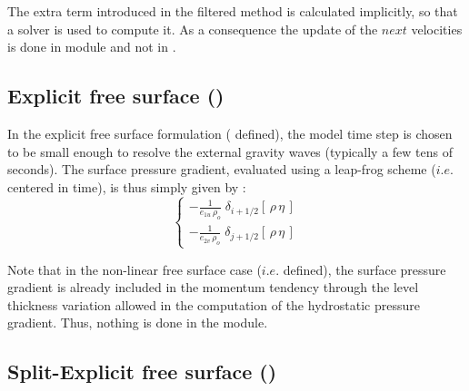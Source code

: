 \documentclass[NEMO_book]{subfiles}
\begin{document}
The extra term introduced in the filtered method is calculated 
implicitly, so that a solver is used to compute it. As a consequence the update of the $next$ 
velocities is done in module  and not in .


\subsection{Explicit free surface ()}
\label{DYN_spg_exp}

In the explicit free surface formulation ( defined), the model time step 
is chosen to be small enough to resolve the external gravity waves (typically a few tens of seconds). 
The surface pressure gradient, evaluated using a leap-frog scheme ($i.e.$ centered in time),
is thus simply given by :
\begin{equation} \label{Eq_dynspg_exp}
\left\{ \begin{aligned}
 - \frac{1}{e_{1u}\,\rho_o} \;	\delta _{i+1/2} \left[  \,\rho \,\eta\,  \right] 	\\
 - \frac{1}{e_{2v}\,\rho_o} \;	\delta _{j+1/2} \left[  \,\rho \,\eta\,  \right]  
\end{aligned} \right.
\end{equation} 

Note that in the non-linear free surface case ($i.e.$  defined), the surface pressure 
gradient is already included in the momentum tendency  through the level thickness variation 
allowed in the computation of the hydrostatic pressure gradient. Thus, nothing is done in the  module.

\subsection{Split-Explicit free surface ()}
\label{DYN_spg_ts}
\end{document}
